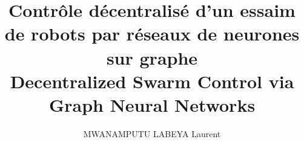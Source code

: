 \documentclass[12pt,a4paper]{report}
\title{Contrôle décentralisé d'un essaim de robots par réseaux de neurones sur graphe\\\large Decentralized Swarm Control via Graph Neural Networks}
\author{MWANAMPUTU LABEYA Laurent}
\date{}
\begin{document}
\titleformat{\chapter}[display]
  {\normalfont\huge\bfseries\filcenter}{\chaptertitlename\ \thechapter}{8pt}{\Huge}
\hypersetup{pageanchor=false}

\hypersetup{pageanchor=true}







\titleformat{\chapter}[display]
  {\normalfont\huge\bfseries}{\chaptertitlename\ \thechapter}{8pt}{\Huge}
\renewcommand{\thefigure}{I.\arabic{figure}}
\renewcommand{\theHfigure}{introduction.\arabic{figure}}
\setcounter{section}{0}
\renewcommand{\thesection}{\arabic{section}}
\renewcommand{\theHsection}{introduction.\arabic{section}}

\renewcommand{\thesection}{\thechapter.\arabic{section}}
\renewcommand{\theHsection}{\theHchapter.\arabic{section}}
\renewcommand{\thefigure}{\thechapter.\arabic{figure}}
\renewcommand{\theHfigure}{\thechapter.\arabic{figure}}




\setcounter{figure}{0}
\renewcommand{\thefigure}{D.\arabic{figure}}
\renewcommand{\theHfigure}{discussion.\arabic{figure}}
\setcounter{table}{0}
\renewcommand{\thetable}{D.\arabic{table}}
\renewcommand{\theHtable}{discussion.\arabic{table}}


\printbibliography[heading=bibintoc]

\end{document}
